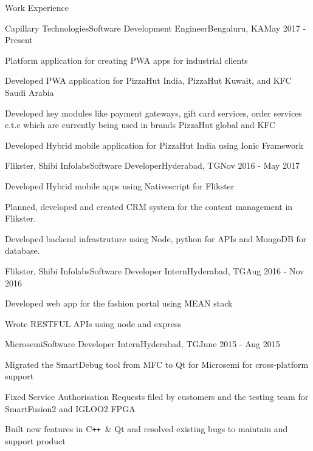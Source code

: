 \documentclass{article}
\newlength{\tabin}
\newlength{\secsep}
\def\Plus{\texttt{+}}
\newcommand{\lineunder}{\vspace*{-8pt} \\ \hspace*{-6pt} \hrulefill \\ \vspace*{-15pt}}
\newenvironment{tabbedsection}[1]{
  \begin{list}{}{
      \setlength{\itemsep}{0pt}
      \setlength{\labelsep}{0pt}
      \setlength{\labelwidth}{0pt}
      \setlength{\leftmargin}{\tabin}
      \setlength{\rightmargin}{\tabin}
      \setlength{\listparindent}{0pt}
      \setlength{\parsep}{0pt}
      \setlength{\parskip}{0pt}
      \setlength{\partopsep}{0pt}
      \setlength{\topsep}{#1}
    }
  \item[]
}{\end{list}}
\newenvironment{resume_section}[1]{
  \filbreak
  \vspace{2\secsep}
  \textsc{\large#1}
  \lineunder
  \begin{tabbedsection}{\secsep}
}{\end{tabbedsection}}
\newenvironment{subitems}{
  \renewcommand{\labelitemi}{-}
  \begin{itemize}
      \setlength{\labelsep}{1em}
}{\end{itemize}}
\newenvironment{resume_employer}[4]{
  \vspace{\secsep}
  \textbf{#1} \\ 
  \indent {\small #2} \hfill {\footnotesize#3 (#4)}
  \begin{tabbedsection}{0pt}
  \begin{subitems}
}{\end{subitems}\end{tabbedsection}}
\begin{document}
\begin{resume_section}{Work Experience}
  \begin{resume_employer}{Capillary Technologies}{Software Development Engineer}{Bengaluru, KA}{May 2017 - Present}
    \item Platform application for creating PWA apps for industrial clients
    \item Developed PWA application for PizzaHut India, PizzaHut Kuwait, and KFC Saudi Arabia
    \item Developed key modules like payment gateways, gift card services, order services e.t.c which are currently being used in brands PizzaHut global and KFC
    \item Developed Hybrid mobile application for PizzaHut India using Ionic Framework
  \end{resume_employer}
  
  \begin{resume_employer}{Flikster, Shibi Infolabs}{Software Developer}{Hyderabad, TG}{Nov 2016 - May 2017}
    \item Developed Hybrid mobile apps using Nativescript for Flikster
    \item Planned, developed and created CRM system for the content management in Flikster.
    \item Developed backend infrastruture using Node, python for APIs and MongoDB for database.
  \end{resume_employer}
  
  \begin{resume_employer}{Flikster, Shibi Infolabs}{Software Developer Intern}{Hyderabad, TG}{Aug 2016 - Nov 2016}
    \item Developed web app for the fashion portal using MEAN stack
    \item Wrote RESTFUL APIs using node and express
  \end{resume_employer}
  
  \begin{resume_employer}{Microsemi}{Software Developer Intern}{Hyderabad, TG}{June 2015 - Aug 2015}
    \item Migrated the SmartDebug tool from MFC to Qt for Microsemi for cross-platform support
    \item Fixed Service Authorisation Requests filed by customers and the testing team for SmartFusion2 and IGLOO2 FPGA
    \item Built new features in C\Plus\Plus\ \& Qt and resolved existing bugs to maintain and support product
  \end{resume_employer}
\end{resume_section}
\end{document}
